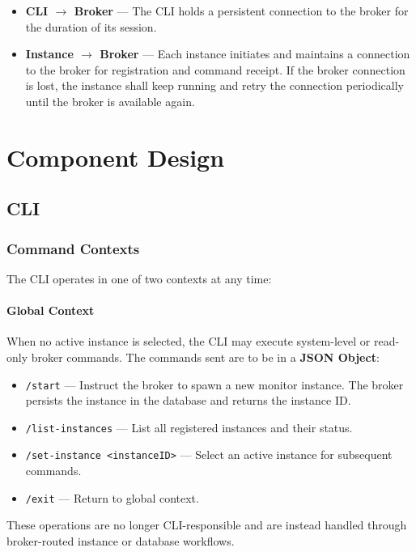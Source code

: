 \documentclass{article}
\begin{document}
\begin{itemize}
    \item \textbf{CLI $\rightarrow$ Broker} --- The CLI holds a persistent
    connection to the broker for the duration of its session.
    \item \textbf{Instance $\rightarrow$ Broker} --- Each instance initiates
    and maintains a connection to the broker for registration and command
    receipt. If the broker connection is lost, the instance shall keep
    running and retry the connection periodically until the broker is
    available again.
\end{itemize}

\section{Component Design}

\subsection{CLI}

\subsubsection{Command Contexts}
The CLI operates in one of two contexts at any time:

\paragraph{Global Context}
When no active instance is selected, the CLI may execute system-level or
read-only broker commands. The commands sent are to be in a \textbf{JSON Object}:

\begin{itemize}
    \item \texttt{/start} --- Instruct the broker to spawn a new monitor
    instance. The broker persists the instance in the database and returns
    the instance ID.
    \item \texttt{/list-instances} --- List all registered instances and
    their status.
    \item \texttt{/set-instance <instanceID>} --- Select an active instance
    for subsequent commands.
    \item \texttt{/exit} --- Return to global context.
\end{itemize}

These operations are no longer CLI-responsible and are instead handled
through broker-routed instance or database workflows.
\end{document}
